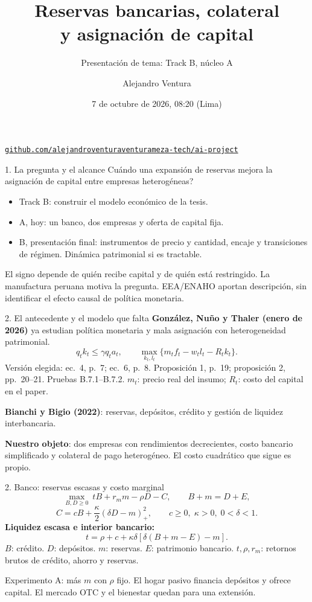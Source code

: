 \documentclass[aspectratio=169,11pt]{beamer}
\title{Reservas bancarias, colateral\\y asignaci\'on de capital}
\author{Alejandro Ventura}
\subtitle{Presentaci\'on de tema: Track B, n\'ucleo A}
\date{7 de octubre de 2026, 08:20 (Lima)}
\begin{document}
\begin{frame}[plain]
 \titlepage
 \begin{center}\footnotesize
 \href{https://github.com/alejandroventuraventurameza-tech/ai-project}
 {\texttt{github.com/alejandroventuraventurameza-tech/ai-project}}
 \end{center}
\end{frame}

\begin{frame}{1. La pregunta y el alcance}
\textquestiondown Cu\'ando una expansi\'on de reservas mejora la asignaci\'on de
capital entre empresas heterog\'eneas?
\medskip
\begin{itemize}
 \item Track B: construir el modelo econ\'omico de la tesis.
 \item A, hoy: un banco, dos empresas y oferta de capital fija.
 \item B, presentaci\'on final: instrumentos de precio y cantidad, encaje y
 transiciones de r\'egimen. Din\'amica patrimonial si es tractable.
\end{itemize}
\medskip
El signo depende de qui\'en recibe capital y de qui\'en est\'a restringido.
La manufactura peruana motiva la pregunta. EEA/ENAHO aportan descripci\'on,
sin identificar el efecto causal de pol\'itica monetaria.
\end{frame}

\begin{frame}{2. El antecedente y el modelo que falta}
\textbf{Gonz\'alez, Nu\~no y Thaler (enero de 2026)} ya estudian
pol\'itica monetaria y mala asignaci\'on con heterogeneidad patrimonial.
\[
 q_tk_t\leq\gamma q_ta_t,\qquad
 \max_{k_t,l_t}\{m_tf_t-w_tl_t-R_tk_t\}.
\]
{\small Versi\'on elegida: ec.~4, p.~7; ec.~6, p.~8. Proposici\'on 1, p.~19;
proposici\'on 2, pp.~20--21. Pruebas B.7.1--B.7.2.
$m_t$: precio real del insumo; $R_t$: costo del capital en el paper.}
\medskip

\textbf{Bianchi y Bigio (2022)}: reservas, dep\'ositos, cr\'edito y
gesti\'on de liquidez interbancaria.
\medskip

\textbf{Nuestro objeto}: dos empresas con rendimientos decrecientes, costo
bancario simplificado y colateral de pago heterog\'eneo.
El costo cuadr\'atico que sigue es propio.
\end{frame}

\begin{frame}{2. Banco: reservas escasas y costo marginal}
\[
 \max_{B,D\geq0}\ tB+r_m m-\rho D-C,
 \qquad B+m=D+E,
\]
\[
 C=cB+\frac{\kappa}{2}(\delta D-m)_+^2,
 \qquad c\geq0,\;\kappa>0,\;0<\delta<1.
\]
\textbf{Liquidez escasa e interior bancario:}
\[
 t=\rho+c+\kappa\delta[\delta(B+m-E)-m].
\]
$B$: cr\'edito. $D$: dep\'ositos. $m$: reservas. $E$: patrimonio bancario.
$t,\rho,r_m$: retornos brutos de cr\'edito, ahorro y reservas.
\medskip

Experimento A: m\'as $m$ con $\rho$ fijo. El hogar pasivo financia dep\'ositos
y ofrece capital. El mercado OTC y el bienestar quedan para una extensi\'on.
\end{frame}
\end{document}
